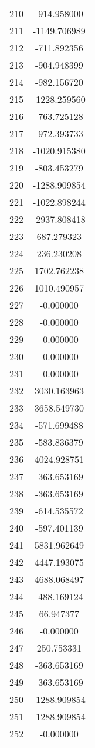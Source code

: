 \documentclass[12pt]{article}
\begin{document}
\begin{longtable}{@{}cc@{}}
210 & -914.958000 \\
211 & -1149.706989 \\
212 & -711.892356 \\
213 & -904.948399 \\
214 & -982.156720 \\
215 & -1228.259560 \\
216 & -763.725128 \\
217 & -972.393733 \\
218 & -1020.915380 \\
219 & -803.453279 \\
220 & -1288.909854 \\
221 & -1022.898244 \\
222 & -2937.808418 \\
223 & 687.279323 \\
224 & 236.230208 \\
225 & 1702.762238 \\
226 & 1010.490957 \\
227 & -0.000000 \\
228 & -0.000000 \\
229 & -0.000000 \\
230 & -0.000000 \\
231 & -0.000000 \\
232 & 3030.163963 \\
233 & 3658.549730 \\
234 & -571.699488 \\
235 & -583.836379 \\
236 & 4024.928751 \\
237 & -363.653169 \\
238 & -363.653169 \\
239 & -614.535572 \\
240 & -597.401139 \\
241 & 5831.962649 \\
242 & 4447.193075 \\
243 & 4688.068497 \\
244 & -488.169124 \\
245 & 66.947377 \\
246 & -0.000000 \\
247 & 250.753331 \\
248 & -363.653169 \\
249 & -363.653169 \\
250 & -1288.909854 \\
251 & -1288.909854 \\
252 & -0.000000 \\

\end{longtable}
\end{document}
